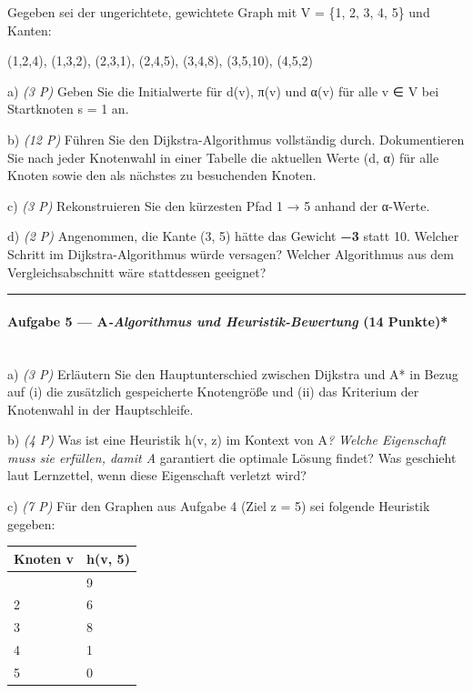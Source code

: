 \documentclass[11pt, a4paper]{article}
\begin{document}
Gegeben sei der ungerichtete, gewichtete Graph mit V = \{1, 2, 3, 4, 5\} und Kanten:


(1,2,4), (1,3,2), (2,3,1), (2,4,5), (3,4,8), (3,5,10), (4,5,2)


a) \textit{(3 P)} Geben Sie die Initialwerte für d(v), π(v) und α(v) für alle v ∈ V bei Startknoten s = 1 an.


b) \textit{(12 P)} Führen Sie den Dijkstra-Algorithmus vollständig durch. Dokumentieren Sie nach jeder Knotenwahl in einer Tabelle die aktuellen Werte (d, α) für alle Knoten sowie den als nächstes zu besuchenden Knoten.


c) \textit{(3 P)} Rekonstruieren Sie den kürzesten Pfad 1 → 5 anhand der α-Werte.


d) \textit{(2 P)} Angenommen, die Kante (3, 5) hätte das Gewicht \textbf{−3} statt 10. Welcher Schritt im Dijkstra-Algorithmus würde versagen? Welcher Algorithmus aus dem Vergleichsabschnitt wäre stattdessen geeignet?



\noindent\textcolor{rulegray}{\rule{\linewidth}{0.4pt}}


\paragraph{Aufgabe 5 — A\textit{-Algorithmus und Heuristik-Bewertung }(14 Punkte)*}\mbox{}\\[2pt]

a) \textit{(3 P)} Erläutern Sie den Hauptunterschied zwischen Dijkstra und A* in Bezug auf (i) die zusätzlich gespeicherte Knotengröße und (ii) das Kriterium der Knotenwahl in der Hauptschleife.


b) \textit{(4 P)} Was ist eine Heuristik h(v, z) im Kontext von A\textit{? Welche Eigenschaft muss sie erfüllen, damit A} garantiert die optimale Lösung findet? Was geschieht laut Lernzettel, wenn diese Eigenschaft verletzt wird?


c) \textit{(7 P)} Für den Graphen aus Aufgabe 4 (Ziel z = 5) sei folgende Heuristik gegeben:



{\small
\begin{tabularx}{\linewidth}{XX}
\hline
\rowcolor{tableheadbg}
{\color{white}\textbf{Knoten v}} & {\color{white}\textbf{h(v, 5)}} \\[2pt]
\hline
\endhead
\hline
\endfoot
1 & 9 \\
2 & 6 \\
3 & 8 \\
4 & 1 \\
5 & 0 \\
\end{tabularx}
}
\end{document}
